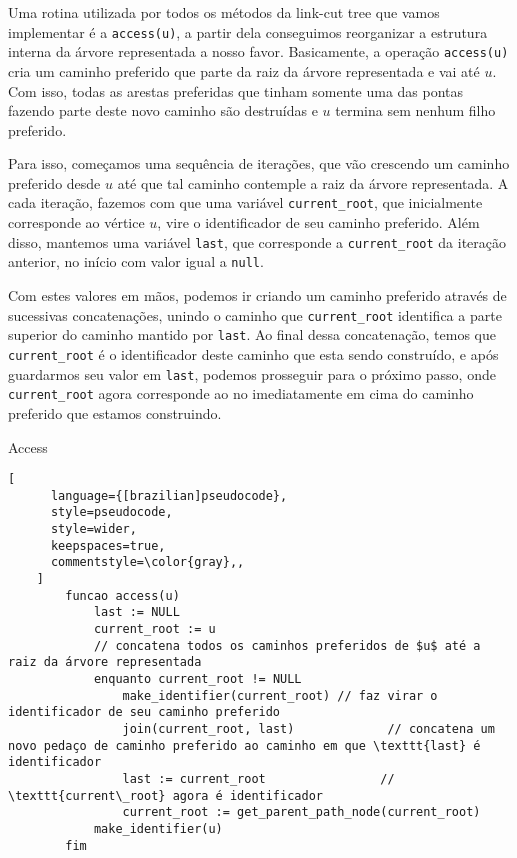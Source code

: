 Uma rotina utilizada por todos os métodos da link-cut tree que vamos implementar é a \texttt{access(u)}, a partir dela conseguimos reorganizar a estrutura interna da árvore representada a nosso favor. Basicamente, a operação \texttt{access(u)} cria um caminho preferido que parte da raiz da árvore representada e vai até $u$. Com isso, todas as arestas preferidas que tinham somente uma das pontas fazendo parte deste novo caminho são destruídas e $u$ termina sem nenhum filho preferido.

Para isso, começamos uma sequência de iterações, que vão crescendo um caminho preferido desde $u$ até que tal caminho contemple a raiz da árvore representada. A cada iteração, fazemos com que uma variável \texttt{current\_root}, que inicialmente corresponde ao vértice $u$, vire o identificador de seu caminho preferido. Além disso, mantemos uma variável \texttt{last}, que corresponde a \texttt{current\_root} da iteração anterior, no início com valor igual a \texttt{null}.

Com estes valores em mãos, podemos ir criando um caminho preferido através de sucessivas concatenações, unindo o caminho que \texttt{current\_root} identifica a parte superior do caminho mantido por \texttt{last}. Ao final dessa concatenação, temos que \texttt{current\_root} é o identificador deste caminho que esta sendo construído, e após guardarmos seu valor em \texttt{last}, podemos prosseguir para o próximo passo, onde \texttt{current\_root} agora corresponde ao no imediatamente em cima do caminho preferido que estamos construindo.

\begin{programruledcaption}{Access\label{lct:access}}
    \begin{lstlisting}[
      language={[brazilian]pseudocode},
      style=pseudocode,
      style=wider,
      keepspaces=true,
      commentstyle=\color{gray},,
    ]
        funcao access(u)
            last := NULL
            current_root := u
            // concatena todos os caminhos preferidos de $u$ até a raiz da árvore representada
            enquanto current_root != NULL
                make_identifier(current_root) // faz virar o identificador de seu caminho preferido 
                join(current_root, last)             // concatena um novo pedaço de caminho preferido ao caminho em que \texttt{last} é identificador
                last := current_root                // \texttt{current\_root} agora é identificador
                current_root := get_parent_path_node(current_root)
            make_identifier(u)
        fim
    \end{lstlisting}
\end{programruledcaption}

